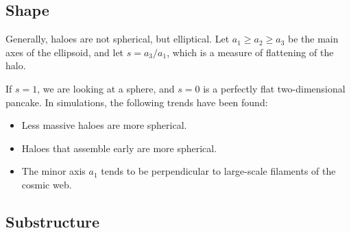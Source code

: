 \subsection{Shape}
Generally, haloes are not spherical, but elliptical.
Let $a_1 \geq a_2 \geq a_3$ be the main axes of the ellipsoid, and let $s = a_3/a_1$, which is a measure of flattening of the halo.

If $s = 1$, we are looking at a sphere, and $s=0$ is a perfectly flat two-dimensional pancake.
In simulations, the following trends have been found:
\begin{itemize}
	\item Less massive haloes are more spherical.
	\item Haloes that assemble early are more spherical.
	\item The minor axis $a_1$ tends to be perpendicular to large-scale filaments of the cosmic web.
\end{itemize}



\subsection{Substructure}

